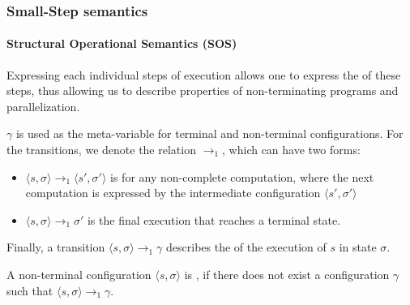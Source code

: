 \newpage
\subsubsection{Small-Step semantics}
\paragraph{Structural Operational Semantics (SOS)}
Expressing each individual steps of execution allows one to express the  of these steps,
thus allowing us to describe properties of non-terminating programs and parallelization.

$\gamma$ is used as the meta-variable for terminal and non-terminal configurations.
For the transitions, we denote the relation $\rightarrow_1$, which can have two forms:
\begin{itemize}
    \item $\langle s, \sigma \rangle \rightarrow_1 \langle s', \sigma' \rangle$ is for any non-complete computation,
          where the next computation is expressed by the intermediate configuration $\langle s', \sigma' \rangle$
    \item $\langle s, \sigma \rangle \rightarrow_1 \sigma'$ is the final execution that reaches a terminal state.
\end{itemize}

Finally, a transition $\langle s, \sigma \rangle \rightarrow_1 \gamma$ describes the  of the execution of $s$ in state $\sigma$.

A non-terminal configuration $\langle s, \sigma \rangle$ is , if there does not exist a configuration $\gamma$ such that $\langle s, \sigma \rangle \rightarrow_1 \gamma$.

